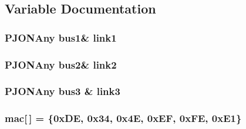 \subsection{Variable Documentation}
\hypertarget{BlinkingSwitch__3way_8ino_ae2f4f4a5ca9a8a627a5132d1868bf5c0}{
\subsubsection[{link1}]{\setlength{\rightskip}{0pt plus 5cm}P\-J\-O\-N\-Any bus1\& link1}}\label{BlinkingSwitch__3way_8ino_ae2f4f4a5ca9a8a627a5132d1868bf5c0}
\hypertarget{BlinkingSwitch__3way_8ino_a6ab0c6e3e6ae04f06e58b38531729623}{
\subsubsection[{link2}]{\setlength{\rightskip}{0pt plus 5cm}P\-J\-O\-N\-Any bus2\& link2}}\label{BlinkingSwitch__3way_8ino_a6ab0c6e3e6ae04f06e58b38531729623}
\hypertarget{BlinkingSwitch__3way_8ino_ad4e8fc0fe300da7ae962f45bc8357a3b}{
\subsubsection[{link3}]{\setlength{\rightskip}{0pt plus 5cm}P\-J\-O\-N\-Any bus3 \& link3}}\label{BlinkingSwitch__3way_8ino_ad4e8fc0fe300da7ae962f45bc8357a3b}
\hypertarget{BlinkingSwitch__3way_8ino_aea3f7775fecafb66a619eb2dcb0357bd}{
\subsubsection[{mac}]{ mac\mbox{[}$\,$\mbox{]} = \{0x\-D\-E, 0x34, 0x4\-E, 0x\-E\-F, 0x\-F\-E, 0x\-E1\}}}\label{BlinkingSwitch__3way_8ino_aea3f7775fecafb66a619eb2dcb0357bd}
